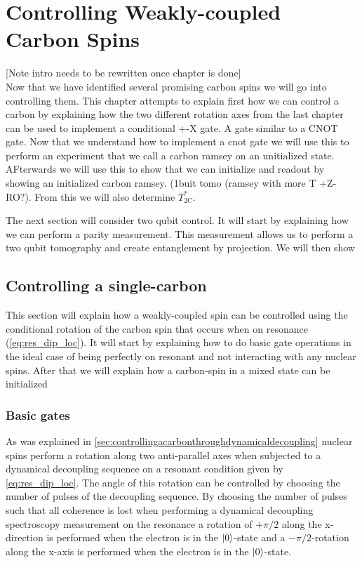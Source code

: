 \chapter{Controlling Weakly-coupled Carbon Spins}
[Note intro needs to be rewritten once chapter is done]\\
Now that we have identified several promising carbon spins we will go into controlling them.
This chapter attempts to explain first how we can control a carbon by explaining how the two different rotation axes from the last chapter can be used to implement a conditional +-X gate. A gate similar to a CNOT gate.
Now that we understand how to implement a cnot gate we will use this to perform an experiment that we call a carbon ramsey on an unitialized state.
AFterwards we will use this to show that we can initialize and readout by showing an initialized carbon ramsey. (1buit tomo (ramsey with more T +Z-RO?).
From this we will also determine $T_{2 \mathrm{C}}^*$.

The next section will consider two qubit control.
It will start by explaining how we can perform a parity measurement. This measurement allows us to perform a two qubit tomography and create entanglement by projection.
We will then show

\section{Controlling a single-carbon}
This section will explain how a weakly-coupled spin can be controlled using the conditional rotation of the carbon spin that occurs when on resonance (\cref{eq:res_dip_loc}).
It will start by explaining how to do basic gate operations in the ideal case of being perfectly on resonant and not interacting with any nuclear spins.
After that we will explain how a carbon-spin in a mixed state can be initialized

\subsection{Basic gates}
As was explained in \cref{sec:controllingacarbonthroughdynamicaldecoupling} nuclear spins perform a rotation along two anti-parallel axes when subjected to a dynamical decoupling sequence on a resonant condition given by \cref{eq:res_dip_loc}. The angle of this rotation can be controlled by choosing the number of pulses of the decoupling sequence. By choosing the number of pulses such that all coherence is lost when performing a dynamical decoupling spectroscopy measurement on the resonance a rotation of $+\pi/2$ along the x-direction is performed when the electron is in the ${\left\vert{0}\right\rangle}$-state and a $-\pi/2$-rotation along the x-axis is performed when the electron is in the ${\left\vert{0}\right\rangle}$-state.


